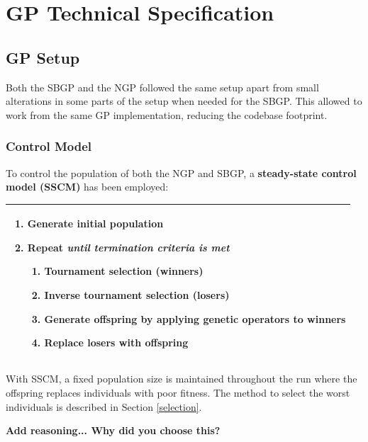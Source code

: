 \documentclass{article}
\begin{document}
\section{GP Technical Specification}
\subsection{GP Setup}
Both the SBGP and the NGP followed the same setup apart from small alterations in some parts of the setup when needed for the SBGP. This allowed to work from the same GP implementation, reducing the codebase footprint.
\subsubsection{Control Model}
\label{steadyState}
To control the population of both the NGP and SBGP, a \textbf{steady-state control model (SSCM)} has been employed:
\begin{table}[h!]
\centering
\begin{tabularx}{\textwidth}{X}
\hline
\begin{enumerate}[label=\arabic*.]
  \item Generate initial population
  \item Repeat \emph{until termination criteria is met}
  \begin{enumerate}[label*=\arabic*.]
    \item Tournament selection (winners)
    \item Inverse tournament selection (losers)
    \item Generate offspring by applying genetic operators to winners
    \item Replace losers with offspring
  \end{enumerate}
\end{enumerate} \\
\hline
\end{tabularx}
\end{table}

With SSCM, a fixed population size is maintained throughout the run where the offspring replaces individuals with poor fitness. The method to select the worst individuals is described in Section \ref{selection}.

\textbf{Add reasoning... Why did you choose this?}
\end{document}
